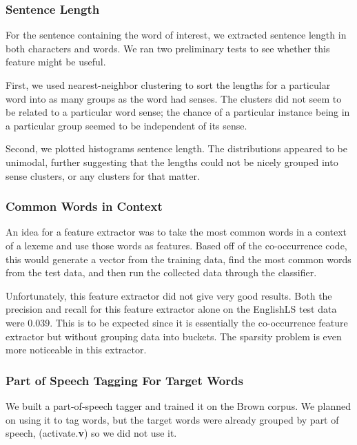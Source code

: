 \documentclass{article}
\begin{document}
\subsubsection{Sentence Length} For the sentence containing the word of
interest, we extracted sentence length in both characters and words. We ran two
preliminary tests to see whether this feature might be useful.

First, we used nearest-neighbor clustering to sort the lengths for a particular
word into as many groups as the word had senses. The clusters did not seem to be
related to a particular word sense; the chance of a particular instance being in
a particular group seemed to be independent of its sense.

Second, we plotted histograms sentence length. The distributions appeared to be
unimodal, further suggesting that the lengths could not be nicely grouped into
sense clusters, or any clusters for that matter.

\subsubsection{Common Words in Context}

An idea for a feature extractor was to take the most common words in a context
of a lexeme and use those words as features. Based off of the co-occurrence code,
this would generate a vector from the training data, find the most common words
from the test data, and then run the collected data through the classifier.

Unfortunately, this feature extractor did not give very good results. Both the
precision and recall for this feature extractor alone on the EnglishLS test data
were 0.039. This is to be expected since it is essentially the co-occurrence
feature extractor but without grouping data into buckets. The sparsity problem
is even more noticeable in this extractor.

\subsubsection{Part of Speech Tagging For Target Words}

We built a part-of-speech tagger and trained it on the Brown corpus. We planned
on using it to tag words, but the target words were already grouped by part of
speech, (activate.\textbf{v}) so we did not use it.


\end{document}
